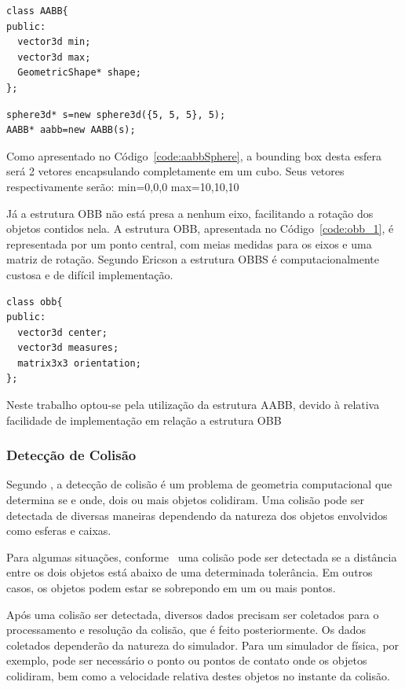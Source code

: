 \begin{lstlisting}[frame=single,caption=Exemplo de AABB\label{code:aabb_1}]
class AABB{
public:
  vector3d min;
  vector3d max;
  GeometricShape* shape;
};
\end{lstlisting}

\begin{lstlisting}[frame=single,caption=Exemplo de AABB e Esfera\label{code:aabbSphere}]
sphere3d* s=new sphere3d({5, 5, 5}, 5);
AABB* aabb=new AABB(s);
\end{lstlisting}


Como apresentado no Código~\ref{code:aabbSphere}, a bounding box desta esfera será 2 vetores encapsulando completamente em um cubo. Seus vetores respectivamente serão: min=0,0,0 max=10,10,10

Já a estrutura OBB não está presa a nenhum eixo, facilitando a rotação dos objetos contidos nela. A estrutura OBB, apresentada no Código~\ref{code:obb_1},  é representada por um ponto central, com meias medidas para os eixos e uma matriz de rotação. Segundo Ericson a estrutura OBBS é computacionalmente custosa e de difícil implementação.

\begin{lstlisting}[frame=single,caption=Código de exemplo de OBB\label{code:obb_1}]
class obb{
public:
  vector3d center;
  vector3d measures;
  matrix3x3 orientation;
};
\end{lstlisting}

Neste trabalho optou-se pela utilização da estrutura AABB, devido à relativa facilidade de implementação em relação a estrutura OBB

\subsubsection{Detecção de Colisão}
Segundo , a detecção de colisão é um problema de geometria computacional que
determina se e onde, dois ou mais objetos colidiram.
Uma colisão pode ser detectada de diversas maneiras dependendo da natureza dos
objetos envolvidos como esferas e caixas.

Para algumas situações, conforme~ uma colisão pode ser detectada se a distância entre os dois objetos está abaixo de uma
determinada tolerância. Em outros casos, os objetos podem estar se sobrepondo em um ou mais pontos.

Após uma colisão ser detectada, diversos dados precisam ser coletados para o processamento e resolução da colisão, que é feito posteriormente. Os dados coletados dependerão da natureza do simulador. Para um simulador de física, por exemplo, pode ser necessário o ponto ou pontos de contato onde os objetos colidiram, bem como a velocidade relativa destes objetos no instante da colisão.


